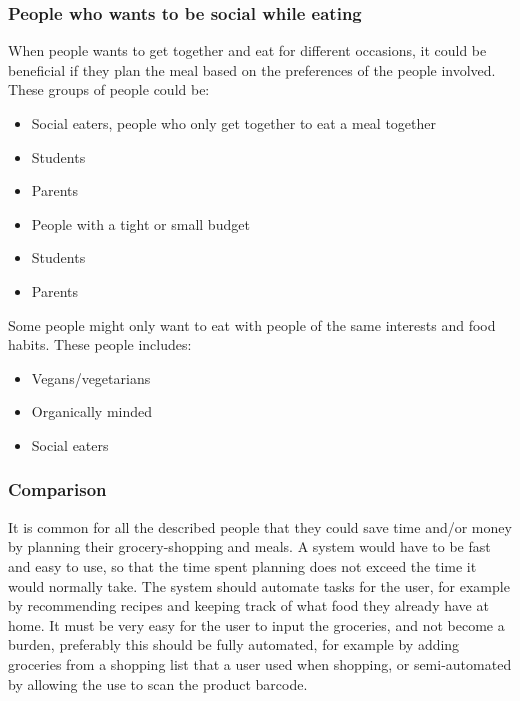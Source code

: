 \subsubsection{People who wants to be social while eating}
When people wants to get together and eat for different occasions, it could be beneficial if they plan the meal based on the preferences of the people involved.
These groups of people could be:
\begin{itemize}
\item Social eaters, people who only get together to eat a meal together
\item Students
\item Parents
\item People with a tight or small budget
\item Students
\item Parents
\end{itemize}

Some people might only want to eat with people of the same interests and food habits. These people includes:

\begin{itemize}
\item Vegans/vegetarians
\item Organically minded
\item Social eaters
\end{itemize}

\subsubsection{Comparison}
It is common for all the described people that they could save time and/or money by planning their grocery-shopping and meals. A system would have to be fast and easy to use, so that the time spent planning does not exceed the time it would normally take. The system should automate tasks for the user, for example by recommending recipes and keeping track of what food they already have at home. It must be very easy for the user to input the groceries, and not become a burden, preferably this should be fully automated, for example by adding groceries from a shopping list that a user used when shopping, or semi-automated by allowing the use to scan the product barcode.

